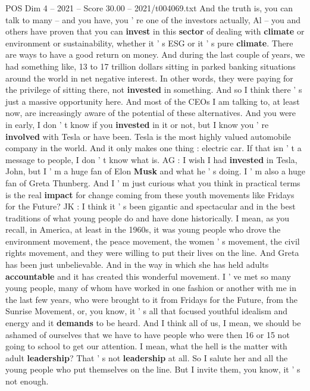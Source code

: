 \begin{textsample}{POS Dim 4 – 2021 – Score 30.00 – 2021/t004069.txt}
And the truth is, you can talk to many -- and you have, you ' re one of the investors actually, Al -- you and others have proven that you can \textbf{invest} in this \textbf{sector} of dealing with \textbf{climate} or environment or sustainability, whether it ' s ESG or it ' s pure \textbf{climate}.
There are ways to have a good return on money.
And during the last couple of years, we had something like, 13 to 17 trillion dollars sitting in parked banking situations around the world in net negative interest.
In other words, they were paying for the privilege of sitting there, not \textbf{invested} in something.
And so I think there ' s just a massive opportunity here.
And most of the CEOs I am talking to, at least now, are increasingly aware of the potential of these alternatives.
And you were in early, I don ' t know if you \textbf{invested} in it or not, but I know you ' re \textbf{involved} with Tesla or have been.
Tesla is the most highly valued automobile company in the world.
And it only makes one thing : electric car.
If that isn ' t a message to people, I don ' t know what is.
AG : I wish I had \textbf{invested} in Tesla, John, but I ' m a huge fan of Elon \textbf{Musk} and what he ' s doing.
I ' m also a huge fan of Greta Thunberg.
And I ' m just curious what you think in practical terms is the real \textbf{impact} for change coming from these youth movements like Fridays for the Future?
JK : I think it ' s been gigantic and spectacular and in the best traditions of what young people do and have done historically.
I mean, as you recall, in America, at least in the 1960s, it was young people who drove the environment movement, the peace movement, the women ' s movement, the civil rights movement, and they were willing to put their lives on the line.
And Greta has been just unbelievable.
And in the way in which she has held adults \textbf{accountable} and it has created this wonderful movement.
I ' ve met so many young people, many of whom have worked in one fashion or another with me in the last few years, who were brought to it from Fridays for the Future, from the Sunrise Movement, or, you know, it ' s all that focused youthful idealism and energy and it \textbf{demands} to be heard.
And I think all of us, I mean, we should be ashamed of ourselves that we have to have people who were then 16 or 15 not going to school to get our attention.
I mean, what the hell is the matter with adult \textbf{leadership}?
That ' s not \textbf{leadership} at all.
So I salute her and all the young people who put themselves on the line.
But I invite them, you know, it ' s not enough.

\end{textsample}
